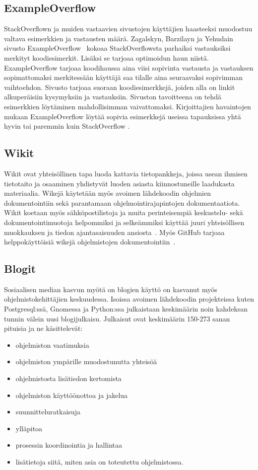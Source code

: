 \documentclass[finnish]{tktltiki2}
\theoremstyle{definition}
\theoremstyle{remark}
\begin{document}
\subsection{ExampleOverflow}
StackOverflown ja muiden vastaavien sivustojen käyttäjien haasteeksi muodostuu valtava esimerkkien ja vastausten määrä. Zagalskyn, Barzilayn ja Yehudain sivusto ExampleOverflow~\cite{example-overflow-social-media-for-code-recommendations} kokoaa StackOverflowsta parhaiksi vastauksiksi merkityt koodiesimerkit. Lisäksi se tarjoaa optimoidun haun niistä. ExampleOverflow tarjoaa koodihaussa aina viisi sopivinta vastausta ja vastauksen sopimattomaksi merkitessään käyttäjä saa tilalle aina seuraavaksi sopivimman vaihtoehdon. Sivusto tarjoaa suoraan koodiesimerkkejä, joiden alla on linkit alkuperäisiin kysymyksiin ja vastauksiin. Sivuston tavoitteena on tehdä esimerkkien löytäminen mahdollisimman vaivattomaksi. Kirjoittajien havaintojen mukaan ExampleOverflow löytää sopivia esimerkkejä useissa tapauksissa yhtä hyvin tai paremmin kuin StackOverflow \cite{example-overflow-social-media-for-code-recommendations}.

\subsection{Wikit}
Wikit ovat yhteisöllinen tapa luoda kattavia tietopankkeja, joissa usean ihmisen tietotaito ja osaaminen yhdistyvät luoden asiasta kiinnostuneille laadukasta materiaalia. Wikejä käytetään myös avoimen lähdekoodin ohjelmien dokumentointiin sekä parantamaan ohjelmointirajapintojen dokumentaatiota. Wikit koetaan myös sähköpostilistoja ja muita perinteisempiä keskustelu- sekä dokumentointimuotoja helpommiksi ja selkeämmiksi käyttää juuri yhteisöllisen muokkauksen ja tiedon ajantasaisuuden ansiosta~\cite{using-wikis-in-sw}.
Myös GitHub tarjoaa helppokäyttöisiä wikejä ohjelmistojen dokumentointiin~\cite{github-wiki}.
\subsection{Blogit}
Sosiaalisen median kasvun myötä on blogien käyttö on kasvanut myös ohjelmistokehittäjien keskuudessa. Isoissa avoimen lähdekoodin projekteissa kuten Postgresql:ssä, Gnomessa ja Python:ssa julkaistaan keskimäärin noin kahdeksan tunnin välein uusi blogijulkaisu. Julkaisut ovat keskimäärin 150-273 sanan pituisia ja ne käsittelevät:
\begin{itemize}
  \item ohjelmiston vaatimuksia
  \item ohjelmiston ympärille muodostunutta yhteisöä
  \item ohjelmistosta lisätiedon kertomista
  \item ohjelmiston käyttöönottoa ja jakelua
  \item suunnitteluratkaisuja
  \item ylläpitoa
  \item prosessin koordinointia ja hallintaa
  \item lisätietoja siitä, miten asia on toteutettu ohjelmistossa.
\end{itemize}
\end{document}
